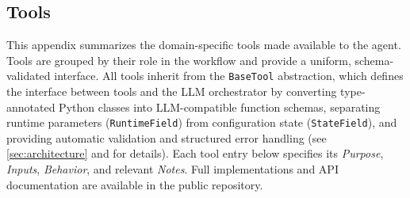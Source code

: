 \documentclass[11pt,oneside]{article}
\numberwithin{equation}{section}
\begin{document}
\newpage
\begin{appendix}

\section{Tools}
\label{app:tools}

This appendix summarizes the domain-specific tools made available to the agent.
Tools are grouped by their role in the workflow and provide a uniform, schema-validated interface.
All tools inherit from the \texttt{BaseTool} abstraction, which defines the interface between tools and the LLM orchestrator by converting type-annotated Python classes into LLM-compatible function schemas, separating runtime parameters (\texttt{RuntimeField}) from configuration state (\texttt{StateField}), and providing automatic validation and structured error handling (see \cref{sec:architecture} and \cite{orchestral-ai} for details).
Each tool entry below specifies its \emph{Purpose}, \emph{Inputs}, \emph{Behavior}, and relevant \emph{Notes}.
Full implementations and API documentation are available in the public repository.


\end{appendix}
\end{document}
